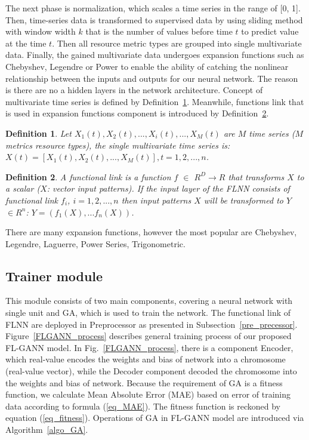 \documentclass[conference]{IEEEtran}
\newtheorem{definition}{Definition}
\begin{document}
The next phase is normalization, which scales a time series in the range of [0, 1]. Then, time-series data is transformed to supervised data by using sliding method with window width $k$ that is the number of values before time $t$ to predict value at the time $t$. Then all resource metric types are grouped into single multivariate data. Finally, the gained multivariate data undergoes expansion functions such as Chebyshev, Legendre or Power to enable the ability of catching the nonlinear relationship between the inputs and outputs for our neural network. The reason is there are no a hidden layers in the network architecture. Concept of multivariate time series is defined by Definition~\ref{definition_1}. Meanwhile, functions link that is used in expansion functions component is introduced by Definition~\ref{definition_2}.

\begin{definition}
\label{definition_1}
Let $X_1(t), X_2(t),. . . , X_i(t),. . . , X_M(t) $ are $M$ time series ($M$ metrics resource types), the single multivariate time series is: \\
$ X(t) = \left[ X_1(t), X_2(t), . . . , X_M (t) \right],  t = 1, 2, . . . , n$.
\end{definition}

\begin{definition}
\label{definition_2}
A functional link is a function $f$ $\in$ $R^D \rightarrow R$ that transforms $X$ to a scalar ($X$: vector input patterns). If the input layer of the FLNN consists of functional link $f_i$, $i = 1,2,..., n$ then input patterns $X$ will be transformed to $Y$ $\in R^n$: $Y = (f_1(X),... f_n(X))$. 
\end{definition}

There are many expansion functions, however the most popular are Chebyshev, Legendre, Laguerre, Power Series, Trigonometric. 

\subsection{Trainer module}
\label{learning_model}
This module consists of two main components, covering a neural network with single unit and GA, which is used to train the network. The functional link of FLNN are deployed in Preprocessor as presented in Subsection~\ref{pre_precessor}. Figure~\ref{FLGANN_process} describes general training process of our proposed FL-GANN model. In Fig.~\ref{FLGANN_process}, there is a component Encoder, which real-value encodes the weights and bias of network into a chromosome (real-value vector), while the Decoder component decoded the chromosome into the weights and bias of network. Because the requirement of GA is a fitness function, we calculate Mean Absolute Error (MAE) based on error of training data according to formula (\ref{eq_MAE}). The fitness function is reckoned by equation (\ref{eq_fitness}). Operations of GA in FL-GANN model are introduced via Algorithm~\ref{algo_GA}.
\end{document}
